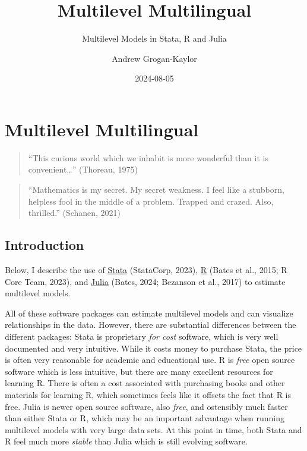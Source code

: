 \documentclass[
  letterpaper,
  DIV=11,
  numbers=noendperiod]{scrreprt}
\title{Multilevel Multilingual}
\subtitle{Multilevel Models in Stata, R and Julia}
\author{Andrew Grogan-Kaylor}
\date{2024-08-05}
\renewcommand*\contentsname{Table of contents}
\newcommand\contentsname{Table of contents}
\begin{document}
\maketitle

\renewcommand*\contentsname{Table of contents}
{
\hypersetup{linkcolor=}
\setcounter{tocdepth}{2}
\tableofcontents
}
\listoftables
{}

\chapter{Multilevel Multilingual}\label{multilevel-multilingual}

\begin{quote}
``This curious world which we inhabit is more wonderful than it is
convenient\ldots{}'' (Thoreau, 1975)
\end{quote}

\begin{quote}
``Mathematics is my secret. My secret weakness. I feel like a stubborn,
helpless fool in the middle of a problem. Trapped and crazed. Also,
thrilled.'' (Schanen, 2021)
\end{quote}

\section{Introduction}\label{introduction}

Below, I describe the use of \href{https://www.stata.com/}{Stata}
(StataCorp, 2023), \href{https://www.r-project.org/}{R} (Bates et al.,
2015; R Core Team, 2023), and \href{https://www.julialang.org/}{Julia}
(Bates, 2024; Bezanson et al., 2017) to estimate multilevel models.

All of these software packages can estimate multilevel models and can
visualize relationships in the data. However, there are substantial
differences between the different packages: Stata is proprietary
\emph{for cost} software, which is very well documented and very
intuitive. While it costs money to purchase Stata, the price is often
very reasonable for academic and educational use. R is \emph{free} open
source software which is less intuitive, but there are many excellent
resources for learning R. There is often a cost associated with
purchasing books and other materials for learning R, which sometimes
feels like it offsets the fact that R is free. Julia is newer open
source software, also \emph{free}, and ostensibly much faster than
either Stata or R, which may be an important advantage when running
multilevel models with very large data sets. At this point in time, both
Stata and R feel much more \emph{stable} than Julia which is still
evolving software.
\end{document}
